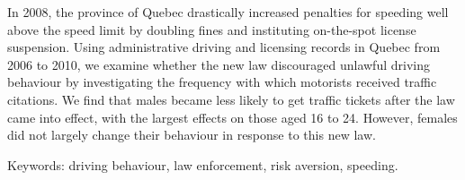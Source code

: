 

In 2008, the province of Quebec drastically increased penalties for speeding 
well above the speed limit by doubling fines and instituting on-the-spot license suspension. 
Using administrative driving and licensing records in Quebec from 2006 to 2010, 
we examine whether the new law discouraged unlawful driving behaviour 
by investigating the frequency with which motorists received traffic citations. 
We find that males became less likely to get traffic tickets after the law came into effect, 
with the largest effects on those aged 16 to 24. 
However, females did not largely change their behaviour in response to this new law. 

Keywords: driving behaviour, law enforcement, risk aversion, speeding.
